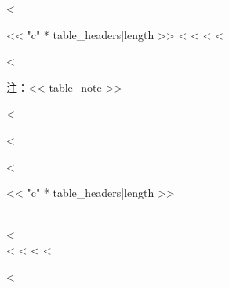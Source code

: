 
<%
\begin{table}[H]
    \centering
    \caption{<< table_caption >>}
    \label{<< table_label >>}
    \begin{tabular}{<< "c" * table_headers|length >>}
        \toprule
        <%
        \midrule
<%
        <%
<%
        \bottomrule
    \end{tabular}
<%
    \begin{tablenotes}
        \small
        \item 注：<< table_note >>
    \end{tablenotes}
<%
\end{table}
<%



<%
\begin{longtable}{<< "c" * table_headers|length >>}
    \caption{<< table_caption >>} \label{<< table_label >>} \\
    \toprule
    <%
    \midrule
    \endfirsthead
     \\
    \toprule
    <%
    \midrule
    \endhead
    \bottomrule
    \endfoot
<%
    <%
<%
\end{longtable}
<%


